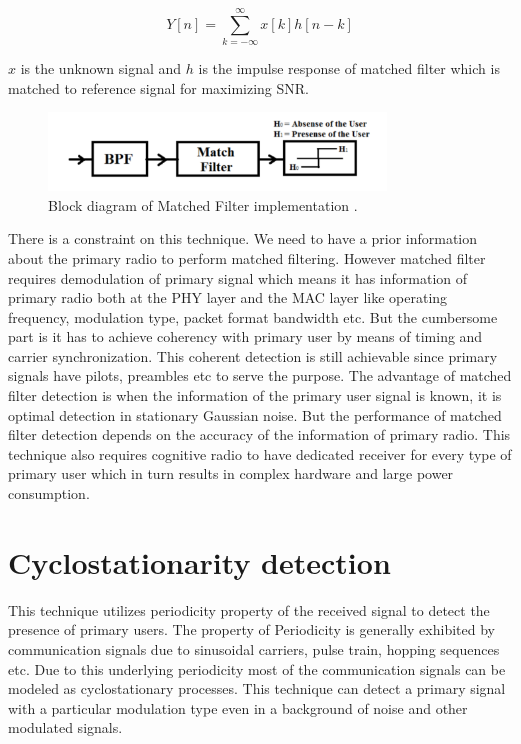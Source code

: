 \begin{equation*}
Y[n] = \sum_{k=-\infty}^{\infty}x[k]h[n-k]
\end{equation*}

$x$ is the unknown signal and $h$ is the impulse response of matched filter which is 
matched to reference signal for maximizing SNR. 

\begin{figure}[h]
\centering
\includegraphics[width=0.8\textwidth]{../images/matchedFilter}
\caption[Matched Filter implementation]{Block diagram 
of Matched Filter implementation {\cite{kranthi13}}.}
\label{matchedFilter}
\end{figure}

There is a constraint on this technique. We need to have a prior information 
about the primary radio to perform matched filtering. However matched filter 
requires demodulation of primary signal which means it has information of 
primary radio both at the PHY layer and the MAC layer like operating frequency, 
modulation type, packet format bandwidth etc. But the cumbersome part is it has 
to achieve coherency with primary user by means of timing and carrier 
synchronization. This coherent detection is still achievable since primary 
signals have pilots, preambles etc to serve the purpose. 
The advantage of matched filter detection is when the information of the primary
user signal is known, it is optimal detection in stationary Gaussian noise. But 
the performance of matched filter detection depends on the accuracy of the 
information of primary radio. This technique also requires cognitive radio to 
have dedicated receiver for every type of primary user which in turn results in 
complex hardware and large power consumption\cite{mansi11}.

\section{Cyclostationarity detection}

This technique utilizes periodicity property of the received signal to detect 
the
presence of primary users. The property of Periodicity is generally exhibited by 
communication signals due to sinusoidal carriers, pulse train, hopping sequences
etc. Due to this underlying periodicity most of the communication signals can be
modeled as cyclostationary processes. This 
technique can detect a primary signal with a particular modulation type even in a
background of noise and other modulated signals.

